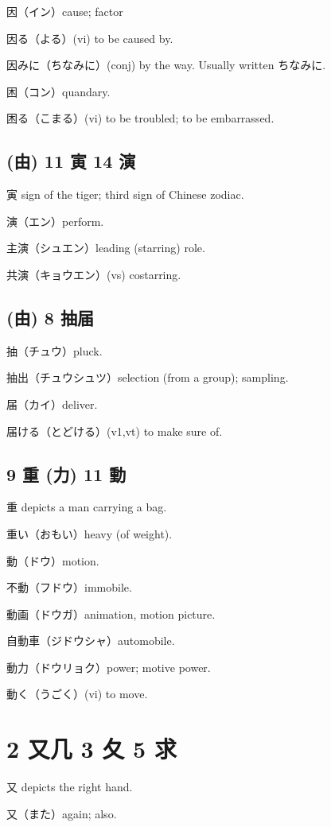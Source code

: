 因（イン）cause; factor

因る（よる）(vi) to be caused by.

因みに（ちなみに）(conj) by the way.
Usually written ちなみに.

困（コン）quandary.

困る（こまる）(vi) to be troubled; to be embarrassed.

\subsection{(由) 11 寅 14 演}

寅 sign of the tiger; third sign of Chinese zodiac.

演（エン）perform.

主演（シュエン）leading (starring) role.

共演（キョウエン）(vs) costarring.

\subsection{(由) 8 抽届}

抽（チュウ）pluck.

抽出（チュウシュツ）selection (from a group); sampling.

届（カイ）deliver.

届ける（とどける）(v1,vt) to make sure of.

\subsection{9 重 (力) 11 動}

重 depicts a man carrying a bag.

重い（おもい）heavy (of weight).

動（ドウ）motion.

不動（フドウ）immobile.

動画（ドウガ）animation, motion picture.

自動車（ジドウシャ）automobile.

動力（ドウリョク）power; motive power.

動く（うごく）(vi) to move.

\section{2 又几 3 夂 5 求}

又 depicts the right hand.

又（また）again; also.

